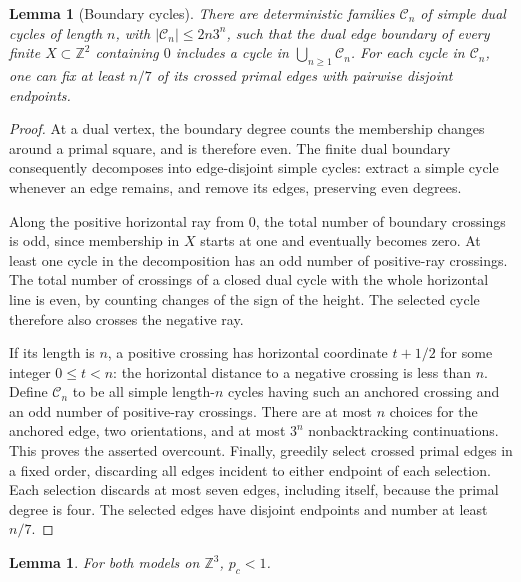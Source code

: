 \documentclass[11pt]{article}
\newtheorem{lemma}[theorem]{Lemma}
\theoremstyle{definition}
\theoremstyle{remark}
\numberwithin{equation}{section}
\begin{document}
\begin{lemma}[Boundary cycles]\label{prelim:contours}
There are deterministic families $\mathcal C_n$ of simple dual cycles of
length $n$, with $|\mathcal C_n|\le 2n3^n$, such that the dual edge boundary
of every finite $X\subset\mathbb Z^2$ containing $0$ includes a cycle in
$\bigcup_{n\ge1}\mathcal C_n$. For each cycle in $\mathcal C_n$, one can
fix at least $n/7$ of its crossed primal edges with pairwise disjoint endpoints.
\end{lemma}

\begin{proof}
At a dual vertex, the boundary degree counts the membership changes around
a primal square, and is therefore even. The finite dual boundary consequently
decomposes into edge-disjoint simple cycles: extract a simple cycle whenever
an edge remains, and remove its edges, preserving even degrees.

Along the positive horizontal ray from $0$, the total number of boundary
crossings is odd, since membership in $X$ starts at one and eventually becomes
zero. At least one cycle in the decomposition has an odd number of positive-ray
crossings. The total number of crossings of a closed dual cycle with the whole
horizontal line is even, by counting changes of the sign of the height.
The selected cycle therefore also crosses the negative ray.

If its length is $n$, a positive crossing has horizontal coordinate
$t+1/2$ for some integer $0\le t<n$: the horizontal distance to a negative
crossing is less than $n$. Define $\mathcal C_n$ to be all simple length-$n$
cycles having such an anchored crossing and an odd number of positive-ray
crossings. There are at most $n$ choices for the anchored edge, two orientations,
and at most $3^n$ nonbacktracking continuations. This proves the asserted
overcount. Finally, greedily select crossed primal edges in a fixed order,
discarding all edges incident to either endpoint of each selection. Each
selection discards at most seven edges, including itself, because the primal
degree is four. The selected edges have disjoint endpoints and number at least
$n/7$.
\end{proof}

\begin{lemma}\label{prelim:pc-below-one}
For both models on $\mathbb Z^3$, $p_c<1$.
\end{lemma}
\end{document}
